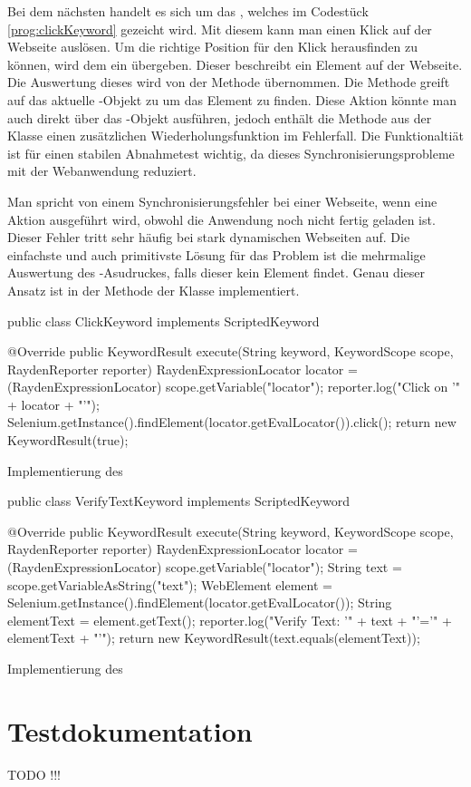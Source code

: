 \SuperPar
Bei dem nächsten  handelt es sich um das , welches im Codestück \ref{prog:clickKeyword} gezeicht wird. Mit diesem  kann man einen Klick auf der Webseite auslösen. Um die richtige Position für den Klick herausfinden zu können, wird dem  ein  übergeben. Dieser  beschreibt ein Element auf der Webseite. Die Auswertung dieses  wird von der Methode  übernommen. Die Methode greift auf das aktuelle -Objekt zu um das Element zu finden. Diese Aktion könnte man auch direkt über das -Objekt ausführen, jedoch enthält die Methode  aus der  Klasse einen zusätzlichen Wiederholungsfunktion im Fehlerfall. Die Funktionaltiät ist für einen stabilen Abnahmetest wichtig, da dieses Synchronisierungsprobleme mit der Webanwendung reduziert. 

\SuperPar
Man spricht von einem Synchronisierungsfehler bei einer Webseite, wenn eine Aktion ausgeführt wird, obwohl die Anwendung noch nicht fertig geladen ist. Dieser Fehler tritt sehr häufig bei stark dynamischen Webseiten auf. Die einfachste und auch primitivste Lösung für das Problem ist die mehrmalige Auswertung des -Asudruckes, falls dieser kein Element findet. Genau dieser Ansatz ist in der  Methode der  Klasse implementiert.

\begin{program}
\begin{JavaCode}
public class ClickKeyword implements ScriptedKeyword {

  @Override
  public KeywordResult execute(String keyword, KeywordScope scope, RaydenReporter reporter) {
    RaydenExpressionLocator locator = (RaydenExpressionLocator) scope.getVariable("locator");
    reporter.log("Click on '" + locator + "'");
    Selenium.getInstance().findElement(locator.getEvalLocator()).click();
    return new KeywordResult(true);
  }
}
\end{JavaCode}
\caption{Implementierung des }
\label{prog:clickKeyword}
\end{program}



\begin{program}
\begin{JavaCode}
public class VerifyTextKeyword implements ScriptedKeyword {

  @Override
  public KeywordResult execute(String keyword, KeywordScope scope, RaydenReporter reporter) {
    RaydenExpressionLocator locator = (RaydenExpressionLocator) scope.getVariable("locator");
    String text = scope.getVariableAsString("text");
    WebElement element = Selenium.getInstance().findElement(locator.getEvalLocator());
    String elementText = element.getText();
    reporter.log("Verify Text: '" + text + "'='" + elementText + "'");
    return new KeywordResult(text.equals(elementText));
  }
}
\end{JavaCode}
\caption{Implementierung des }
\label{prog:verifyTextKeyword}
\end{program}

\todo

\clearpage

\section{Testdokumentation}

TODO !!!
